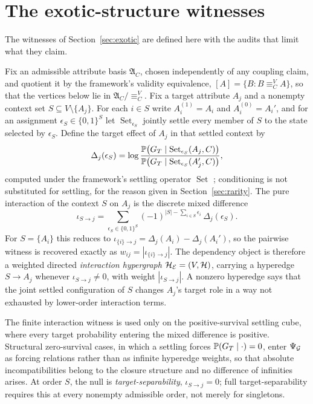 \appendix
\section{The exotic-structure witnesses}\label{app:witnesses}

The witnesses of Section~\ref{sec:exotic} are defined here with the audits
that limit what they claim. \begin{definition}\label{def:exotic}
Fix an admissible attribute basis $\mathfrak A_C$, chosen independently
of any coupling claim, and quotient it by the framework's validity
equivalence, $[A]=\{B:B\equiv^{V}_{C}A\}$, so that the vertices below
lie in $\mathfrak A_C/{\equiv^{V}_{C}}$. Fix a target attribute $A_j$
and a nonempty context set $S\subseteq V\setminus\{A_j\}$. For each
$i\in S$ write $A_i^{(1)}=A_i$ and $A_i^{(0)}=A_i'$, and for an
assignment $\epsilon_S\in\{0,1\}^{S}$ let
$\operatorname{Set}_{\epsilon_S}$ jointly settle every member of $S$
to the state selected by $\epsilon_S$. Define the target effect of
$A_j$ in that settled context by
\[
\Delta_j(\epsilon_S)=
\log\frac{\mathbb{P}\bigl(G_T\mid
\operatorname{Set}_{\epsilon_S}(A_j,C)\bigr)}
{\mathbb{P}\bigl(G_T\mid
\operatorname{Set}_{\epsilon_S}(A_j',C)\bigr)},
\]
computed under the framework's settling operator $\operatorname{Set}$
\cite{Aethus}; conditioning is not substituted for settling, for the
reason given in Section~\ref{sec:rarity}. The pure interaction of the
context $S$ on $A_j$ is the discrete mixed difference
\[
\iota_{S\to j}
=
\sum_{\epsilon_S\in\{0,1\}^{S}}
(-1)^{|S|-\sum_{i\in S}\epsilon_i}\,
\Delta_j(\epsilon_S).
\]
For $S=\{A_i\}$ this reduces to
$\iota_{\{i\}\to j}=\Delta_j(A_i)-\Delta_j(A_i')$, so the pairwise
witness is recovered exactly as $w_{ij}=|\iota_{\{i\}\to j}|$. The
dependency object is therefore a weighted directed \emph{interaction
hypergraph} $\mathcal H_{\mathcal{E}}=(V,\mathcal H)$, carrying a hyperedge
$S\to A_j$ whenever $\iota_{S\to j}\neq0$, with weight $|\iota_{S\to
j}|$. A nonzero hyperedge says that the joint settled configuration of
$S$ changes $A_j$'s target role in a way not exhausted by lower-order
interaction terms.

The finite interaction witness is used only on the positive-survival
settling cube, where every target probability entering the mixed
difference is positive. Structural zero-survival cases, in which a
settling forces $\mathbb{P}(G_T\mid\cdot)=0$, enter $\Psi_{\mathcal{G}}$ as forcing
relations rather than as infinite hyperedge weights, so that absolute
incompatibilities belong to the closure structure and no difference of
infinities arises. At order $S$, the null is \emph{target-separability},
$\iota_{S\to j}=0$; full target-separability requires this at every
nonempty admissible order, not merely for singletons.


\end{definition}

